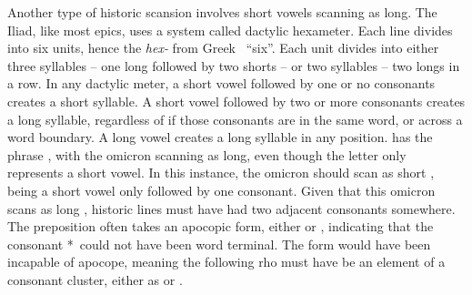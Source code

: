 

Another type of historic scansion involves short vowels scanning as long.  
The Iliad, like most epics, uses a system called dactylic hexameter. Each line divides into six units, hence the \textit{hex-} from Greek \ ``six''. Each unit divides into either three syllables -- one long followed by two shorts -- or two syllables -- two longs in a row.
In any dactylic meter, a short vowel followed by one or no consonants creates a short syllable. A short vowel followed by two or more consonants creates a long syllable, regardless of if those consonants are in the same word, or across a word boundary. A long vowel creates a long syllable in any position.   has the phrase , with the omicron  scanning as long, even though the letter only represents a short vowel.\autocite[V.803]{Iliad_1999} In this instance, the omicron should scan as short , being a short vowel only followed by one consonant. Given that this omicron scans as long , historic lines must have had two adjacent consonants somewhere. The preposition  often takes an apocopic form, either  or , indicating that the consonant *\w\ could not have been word terminal. The form  would have been incapable of apocope, meaning the following rho  must have be an element of a consonant cluster, either as  or .

